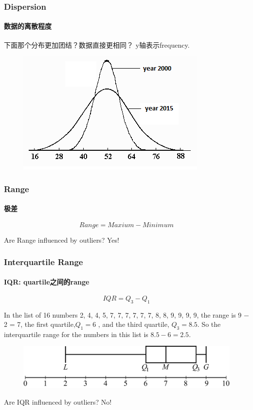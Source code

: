 \documentclass[
	11pt, %
]{beamer}
\begin{document}

\begin{frame}
	\frametitle{Dispersion}
	\framesubtitle{数据的离散程度}
	{\LARGE 下面那个分布更加团结？数据直接更相同？} y轴表示frequency.
		\begin{figure}
		\includegraphics[width=0.7\linewidth]{Dispersion.png}
	\end{figure}
\end{frame}



\begin{frame}
	\frametitle{Range}
	\framesubtitle{极差}
	\begin{definition}
		\begin{equation*}
			Range = Maxium - Minimum
		\end{equation*}
	\end{definition}
	\pause
	\alert{Are Range influenced by outliers?} \pause Yes!
\end{frame}



\begin{frame}
	\frametitle{Interquartile Range}
	\framesubtitle{IQR: quartile之间的range}
	\begin{definition}
		\begin{equation*}
			IQR = Q_3 - Q_1
		\end{equation*}
	\end{definition}
\begin{example}
In the list of 16 numbers 2, 4, 4, 5, 7, 7, 7, 7, 7, 7, 8, 8, 9, 9,
9, 9, the range is 9 − 2 = 7, the first quartile,$Q_1 = 6$ , and the third quartile, $Q_3 = 8.5$. So the interquartile range for the numbers in this list is $8.5 - 6 = 2.5$.
		\begin{figure}
		\includegraphics[width=0.7\linewidth]{IQR.jpg}
	\end{figure}
\end{example}
	\pause
	\alert{Are IQR influenced by outliers?} \pause No!
\end{frame}
\end{document}
